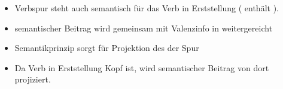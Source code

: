 {{\hspace{1em}
\begin{itemize}
\item Verbspur steht auch semantisch für das Verb in Erststellung ( enthält \cont).
\pause
\item semantischer Beitrag wird gemeinsam mit Valenzinfo in \dsl weitergereicht
\pause
\item Semantikprinzip sorgt für Projektion des \contws der Spur
\pause
\item Da Verb in Erststellung Kopf ist, wird semantischer Beitrag von dort projiziert.


\end{itemize}}}
